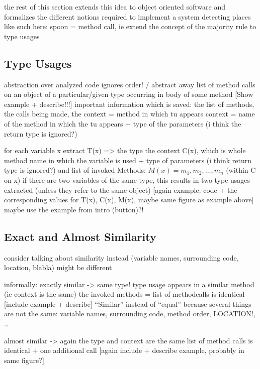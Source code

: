 the rest of this section extends this idea to object oriented software and formalizes the different notions required to implement a system detecting places like such
here: spoon = method call, ie extend the concept of the majority rule to type usages

\subsection{Type Usages}
abstraction over analyzed code
ignores order! / abstract away
list of method calls on an object of a particular/given type occurring in body of some method
[Show example + describe!!!]
important information which is saved: the list of methods, the calls being made, the context = method in which tu appears
context = name of the method in which the tu appears + type of the parameters (i think the return type is ignored?)

for each variable x
extract T(x) => the type
the context C(x), which is whole method name in which the variable is used + type of parameters (i think return type is ignored?)
and list of invoked Methods: $M(x) = {m_1, m_2, \dotsc, m_n}$ (within C on x)
if there are two variables of the same type, this results in two type usages extracted (unless they refer to the same object)
[again example: code + the corresponding values for T(x), C(x), M(x), maybe same figure as example above]
maybe use the example from intro (button)?!

\subsection{Exact and Almost Similarity}

consider talking about similarity instead (variable names, surrounding code, location, blabla) might be different

informally:
exactly similar ->
    same type!
    type usage appears in a similar method (ie context is the same)
    the invoked methods = list of methodcalls is identical
[include example + describe]
``Similar'' instead of ``equal'' because several things are not the same:
variable names, surrounding code, method order, LOCATION!, \ldots

almost similar ->
    again the type and context are the same
    list of method calls is identical + one additional call
    [again include + describe example, probably in same figure?]

